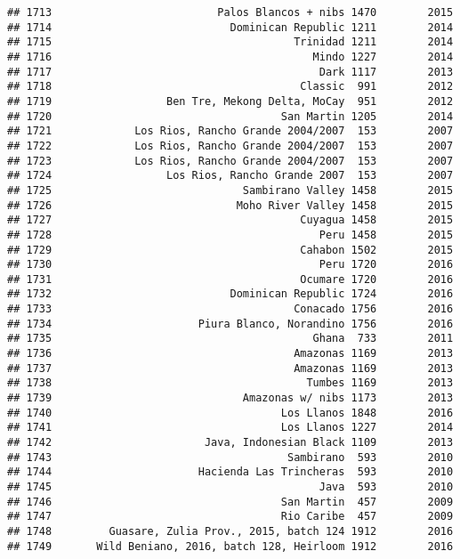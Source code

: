 \documentclass[
]{article}
\begin{document}
\begin{verbatim}
## 1713                          Palos Blancos + nibs 1470        2015
## 1714                            Dominican Republic 1211        2014
## 1715                                      Trinidad 1211        2014
## 1716                                         Mindo 1227        2014
## 1717                                          Dark 1117        2013
## 1718                                       Classic  991        2012
## 1719                  Ben Tre, Mekong Delta, MoCay  951        2012
## 1720                                    San Martin 1205        2014
## 1721             Los Rios, Rancho Grande 2004/2007  153        2007
## 1722             Los Rios, Rancho Grande 2004/2007  153        2007
## 1723             Los Rios, Rancho Grande 2004/2007  153        2007
## 1724                  Los Rios, Rancho Grande 2007  153        2007
## 1725                              Sambirano Valley 1458        2015
## 1726                             Moho River Valley 1458        2015
## 1727                                       Cuyagua 1458        2015
## 1728                                          Peru 1458        2015
## 1729                                       Cahabon 1502        2015
## 1730                                          Peru 1720        2016
## 1731                                       Ocumare 1720        2016
## 1732                            Dominican Republic 1724        2016
## 1733                                      Conacado 1756        2016
## 1734                       Piura Blanco, Norandino 1756        2016
## 1735                                         Ghana  733        2011
## 1736                                      Amazonas 1169        2013
## 1737                                      Amazonas 1169        2013
## 1738                                        Tumbes 1169        2013
## 1739                              Amazonas w/ nibs 1173        2013
## 1740                                    Los Llanos 1848        2016
## 1741                                    Los Llanos 1227        2014
## 1742                        Java, Indonesian Black 1109        2013
## 1743                                     Sambirano  593        2010
## 1744                       Hacienda Las Trincheras  593        2010
## 1745                                          Java  593        2010
## 1746                                    San Martin  457        2009
## 1747                                    Rio Caribe  457        2009
## 1748         Guasare, Zulia Prov., 2015, batch 124 1912        2016
## 1749       Wild Beniano, 2016, batch 128, Heirloom 1912        2016

\end{verbatim}
\end{document}
